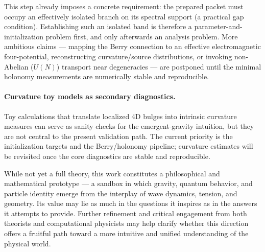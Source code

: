 This step already imposes a concrete requirement: the prepared packet must occupy an effectively isolated
branch on its spectral support (a practical gap condition). Establishing such an isolated band is therefore
a parameter-and-initialization problem first, and only afterwards an analysis problem.
More ambitious claims --- mapping the Berry connection to an effective electromagnetic four-potential,
reconstructing curvature/source distributions, or invoking non-Abelian ($U(N)$) transport near degeneracies ---
are postponed until the minimal holonomy measurements are numerically stable and reproducible.

\paragraph{Curvature toy models as secondary diagnostics.}
Toy calculations that translate localized 4D bulges into intrinsic curvature measures can serve as
sanity checks for the emergent-gravity intuition, but they are not central to the present validation
path. The current priority is the initialization targets and the Berry/holonomy pipeline; curvature
estimates will be revisited once the core diagnostics are stable and reproducible.

While not yet a full theory, this work constitutes a philosophical and
mathematical prototype --- a sandbox in which gravity, quantum behavior,
and particle identity emerge from the interplay of wave dynamics,
tension, and geometry. Its value may lie as much in the questions it
inspires as in the answers it attempts to provide. Further refinement
and critical engagement from both theorists and computational physicists
may help clarify whether this direction offers a fruitful path toward a
more intuitive and unified understanding of the physical world.